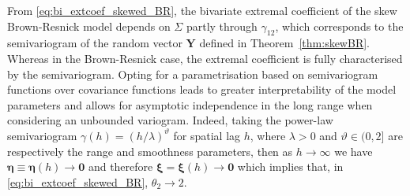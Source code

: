 \documentclass[12pt]{article}
\begin{document}
From \eqref{eq:bi_extcoef_skewed_BR}, the bivariate extremal coefficient of the skew Brown-Resnick model depends on $\Sigma$ partly through $\gamma_{12}$, which corresponds to the semivariogram of the random vector $\bm Y$ defined in Theorem~\ref{thm:skewBR}. Whereas in the Brown-Resnick case, the extremal coefficient is fully characterised by the semivariogram.
%
Opting for a parametrisation based on semivariogram functions over covariance functions leads to greater interpretability of the model parameters and allows for asymptotic independence in the long range when considering an unbounded variogram. Indeed, taking the power-law semivariogram $\gamma(h) = (h/\lambda)^\vartheta$ for spatial lag $h$, where $\lambda>0$ and  $\vartheta \in (0,2]$ are respectively the range and smoothness parameters,
then as $h \rightarrow \infty$ we have $\bm \eta \equiv \bm \eta (h) \rightarrow \bm 0$ and therefore $\bm \xi = \bm \xi(h) \rightarrow \bm 0$ which implies that, in \eqref{eq:bi_extcoef_skewed_BR}, $\theta_2 \rightarrow 2$.
%
\end{document}
